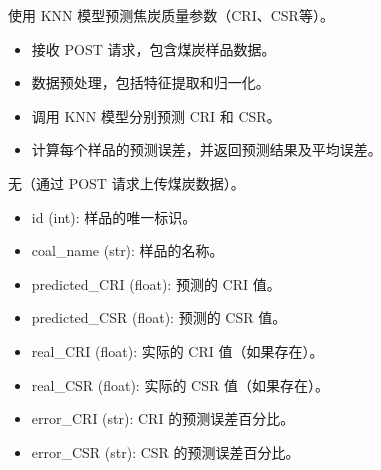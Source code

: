\documentclass[a4paper,12pt,english]{sphinxmanual}
\begin{document}
\begin{fulllineitems}
\label{\detokenize{api/login:login.getCokeQualityfyeResultAIKNN}}
\pysigstartsignatures
{}
\pysigstopsignatures
\sphinxAtStartPar
使用 KNN 模型预测焦炭质量参数（CRI、CSR等）。
\begin{description}
\begin{itemize}
\item {} 
\sphinxAtStartPar
接收 POST 请求，包含煤炭样品数据。

\item {} 
\sphinxAtStartPar
数据预处理，包括特征提取和归一化。

\item {} 
\sphinxAtStartPar
调用 KNN 模型分别预测 CRI 和 CSR。

\item {} 
\sphinxAtStartPar
计算每个样品的预测误差，并返回预测结果及平均误差。

\end{itemize}

\sphinxAtStartPar
无（通过 POST 请求上传煤炭数据）。

\begin{description}
\begin{itemize}
\item {} 
\sphinxAtStartPar
id (int): 样品的唯一标识。

\item {} 
\sphinxAtStartPar
coal\_name (str): 样品的名称。

\item {} 
\sphinxAtStartPar
predicted\_CRI (float): 预测的 CRI 值。

\item {} 
\sphinxAtStartPar
predicted\_CSR (float): 预测的 CSR 值。

\item {} 
\sphinxAtStartPar
real\_CRI (float): 实际的 CRI 值（如果存在）。

\item {} 
\sphinxAtStartPar
real\_CSR (float): 实际的 CSR 值（如果存在）。

\item {} 
\sphinxAtStartPar
error\_CRI (str): CRI 的预测误差百分比。

\item {} 
\sphinxAtStartPar
error\_CSR (str): CSR 的预测误差百分比。


\end{itemize}
\end{description}
\end{description}
\end{fulllineitems}
\end{document}
